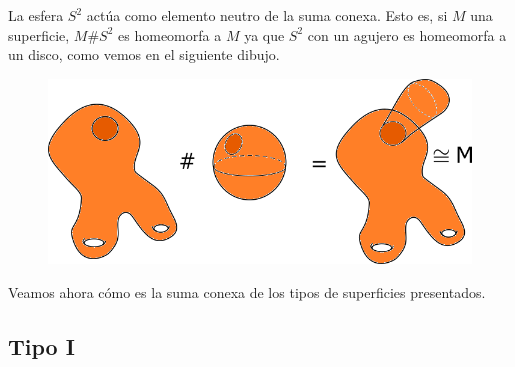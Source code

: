 \documentclass[GTS.tex]{subfiles}
\begin{document}
\begin{ej}
La esfera $S^2$ actúa como elemento neutro de la suma conexa. Esto es, si $M$ una superficie, 
$M\# S^2$ es homeomorfa a $M$ ya que $S^2$ con un agujero es homeomorfa a un disco, como vemos en el siguiente dibujo.
\begin{figure}[h!]
	\includegraphics[scale=0.5]{text4248}
\end{figure}
\end{ej}

Veamos ahora cómo es la suma conexa de los tipos de superficies presentados.

\subsection{Tipo I}
\end{document}
